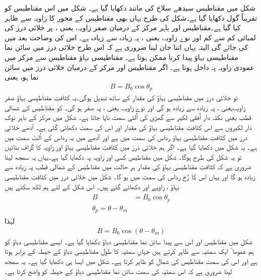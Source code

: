 شکل  میں مقناطیس سیدھے سلاخ کی مانند دکھایا گیا ہے۔ شکل  میں اس مقناطیس کو تقریباً گول دکھایا گیا ہے۔شکل  کی طرح یہاں بھی مقناطیس کے محور کا زاویہ  سے ظاہر کیا گیا ہے۔مقناطیس اور باہر مرکز کے درمیان صفر زاویہ، یعنی   ، پر خلائی درز کی لمبائی کم سے کم اور نوے  زاویہ، یعنی  ، پہ زیادہ سے زیادہ ہے۔ اس کی وضاحت بعد میں کی جائے گی البتہ یہاں اتنا جان لینا ضروری ہے کہ اس طرح خلائی درز میں سائن نما مقناطیسی بہاؤ پیدا کرنا ممکن ہوتا ہے۔ مقناطیسی بہاؤ مقناطیس سے مرکز میں عمودی زاویہ پہ داخل ہوتا ہے۔  اگر مقناطیس اور مرکز کے درمیان خلائی درز میں  سائن نما ہو، یعنی
\begin{align}
B=B_0 \cos \theta_p
\end{align}
تو خلائی درز میں مقناطیسی بہاؤ  کی مقدار  کے ساتھ تبدیل ہوگی۔یہ کثافتِ مقناطیسی بہاؤ صفر زاویہ،یعنی ، پہ زیادہ سے زیادہ ہو گی اور نوے زاویہ، یعنی  ، پہ صفر ہو گی۔ کو مقناطیس کے شمالی قطب یعنی نکتہ دار اُفقی لکیر سے گھڑی کی اُلٹی سمت ناپا جاتا ہے۔  شکل  میں  مرکز کے باہر نوک دار لکیروں سے اس کثافتِ مقناطیسی بہاؤ کی مقدار اور اس کی سمت دکھائی گئی ہے۔ آدھے خلائی درز میں کثافتِ مقناطیسی بہاؤ  رداس کی سمت میں ہے اور آدھے میں یہ رداس کے اُلٹ سمت میں ہے۔  یہ شکل میں دکھایا گیا ہے۔ اگر ہم خلائی درز میں کثافتِ مقناطیسی بہاؤ  اور  زاویہ  کا گراف بنائیں تو یہ شکل کی طرح ہوگا۔ شکل  میں مقناطیس کسی اور زاویہ پہ دکھایا گیا ہے۔یہاں یہ سمجھ لینا ضروری ہے کہ کثافتِ مقناطیسی بہاؤ کی مقدار  ہر حالت میں مقناطیس کے شمالی قطب پہ زیادہ سے زیادہ ہو گا اور یہاں اس کا رُخ رداس کی  سمت میں ہو گا۔ شکل میں خلائی درز میں کثافتِ مقناطیسی بہاؤ ، زاویے  اور  دکھائے گئے ہیں۔ اس شکل کے لئے ہم لکھ سکتے ہیں
\begin{gather}
\begin{aligned}
B&=B_0 \cos \theta_p\\
\theta_p=\theta-\theta_m
\end{aligned}
\end{gather}
لہٰذا
\begin{align}
B=B_0 \cos (\theta-\theta_m)
\end{align}
شکل  میں مقناطیس اور اس سے پیدا سائن نما مقناطیسی دباؤ دکھایا گیا ہے۔ ایسے مقناطیسی دباؤ کو ہم عموما ً ایک سمتیہ سے ظاہر کرتے ہیں جہاں سمتیہ کا طول مقناطیسی دباؤ کے حیطہ کے برابر ہوتا ہے اور اس کی سمت مقناطیس کی شمال کو ظاہر کرتا ہے۔ شکل  میں ایسا ہی دکھایا گیا ہے۔ یہ سمجھ لینا ضروری ہے کہ اس سمتیہ کی سمت سائن نما مقناطیسی دباؤ کے حیطہ کو واضح کرتا ہے۔ 

